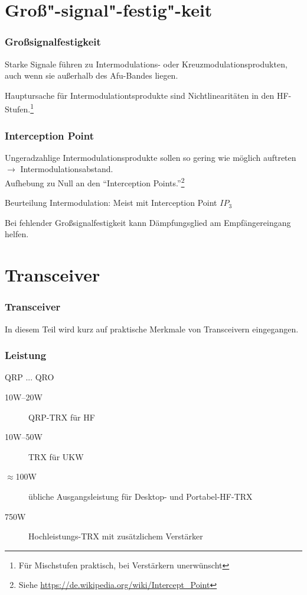 \section{Groß"-signal"-festig"-keit}

\begin{frame}
    \frametitle{Großsignalfestigkeit}

    Starke Signale führen zu Intermodulations- oder Kreuzmodulationsprodukten,
    auch wenn sie außerhalb des Afu-Bandes liegen.

    \bigskip

    Hauptursache für Intermodulationtsprodukte sind Nichtlinearitäten in den
    HF-Stufen.\footnote{Für Mischstufen praktisch, bei Verstärkern unerwünscht}

\end{frame}

\begin{frame}
    \frametitle{Interception Point}

    Ungeradzahlige Intermodulationsprodukte sollen so gering wie möglich
    auftreten\\
    $\rightarrow$ Intermodulationsabstand.\\
    Aufhebung zu Null an den ``Interception Points.''\footnote{Siehe \url{https://de.wikipedia.org/wiki/Intercept_Point}}


    Beurteilung Intermodulation: Meist mit Interception Point $IP_3$

    \bigskip

    Bei fehlender Großsignalfestigkeit kann Dämpfungsglied am
    Empfängereingang helfen.

\end{frame}

\section{Transceiver}

\begin{frame}
    \frametitle{Transceiver}

    In diesem Teil wird kurz auf praktische Merkmale von Transceivern
    eingegangen.

\end{frame}

\begin{frame}
    \frametitle{Leistung}

    {\Large QRP ... QRO}

    \pause

    \begin{description}
      \item[10W--20W] QRP-TRX für HF
      \item[10W--50W] TRX für UKW
      \item[$\approx$100W] übliche Ausgangsleistung für Desktop- und Portabel-HF-TRX
      \item[750W] Hochleistungs-TRX mit zusätzlichem Verstärker
    \end{description}

\end{frame}

